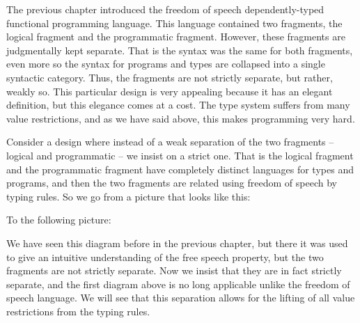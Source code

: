 


\renewcommand{\Sepdrulename}[1]{\scriptsize \textsc{#1}}
\renewcommand{\SepUdrulename}[1]{\scriptsize \textsc{#1}}

The previous chapter introduced the freedom of speech
dependently-typed functional programming language. This language
contained two fragments, the logical fragment and the programmatic
fragment.  However, these fragments are judgmentally kept separate.
That is the syntax was the same for both fragments, even more so the
syntax for programs and types are collapsed into a single syntactic
category.  Thus, the fragments are not strictly separate, but rather,
weakly so.  This particular design is very appealing because it has an
elegant definition, but this elegance comes at a cost.  The type
system suffers from many value restrictions, and as we have said
above, this makes programming very hard.

Consider a design where instead of a weak separation of the two
fragments -- logical and programmatic -- we insist on a strict one.
That is the logical fragment and the programmatic fragment have
completely distinct languages for types and programs, and then the two
fragments are related using freedom of speech by typing rules.  So we
go from a picture that looks like this:
\begin{center}
\end{center}
To the following picture:
\begin{center}
\end{center}
We have seen this diagram before in the previous chapter, but there it
was used to give an intuitive understanding of the free speech
property, but the two fragments are not strictly separate.  Now we
insist that they are in fact strictly separate, and the first diagram
above is no long applicable unlike the freedom of speech language.  We
will see that this separation allows for the lifting of all value
restrictions from the typing rules.  

